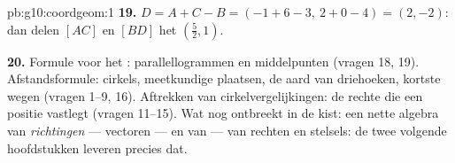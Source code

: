 \begin{solution}{pb:g10:coordgeom:1}
\textbf{19.} $D = A + C - B = (-1 + 6 - 3,\ 2 + 0 - 4) = (2, -2)$: dan delen
$[AC]$ en $[BD]$ het  $\left(\frac52, 1\right)$.

\textbf{20.} Formule voor het : parallellogrammen en middelpunten
(vragen 18, 19). Afstandsformule: cirkels, meetkundige plaatsen, de aard van
driehoeken, kortste wegen (vragen 1--9, 16). Aftrekken van
cirkelvergelijkingen: de rechte die een positie vastlegt (vragen 11--15). Wat
nog ontbreekt in de kist: een nette algebra van \emph{richtingen} ---
vectoren --- en van \emph{} ---  van
rechten en stelsels: de twee volgende hoofdstukken leveren precies dat.
\end{solution}
